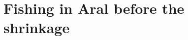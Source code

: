 \chapter{Fishing in Aral before the shrinkage}
\label{cp:aral-fishing}

\begin{figure}[htbp]
  \centering
  \begin{minipage}[b]{0.45\textwidth}
    \centering
    
  \end{minipage}
  \hfill
  \begin{minipage}[b]{0.45\textwidth}
    \centering


\end{minipage}
\end{figure}
